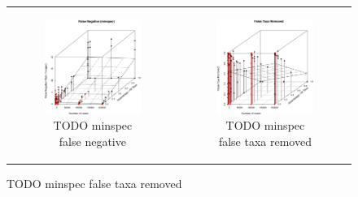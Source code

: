 \begin{figure}
\begin{tabular}{cc}
\begin{subfigure}[b]{0.5\textwidth}
\centering
\includegraphics[width=\textwidth]{../polarfront/minspecfalsenegative.png}
\caption{TODO minspec false negative}
\label{fig:minspecvalidationminspecfalsenegative}
\end{subfigure}

&

\begin{subfigure}[b]{0.5\textwidth}
\centering
\includegraphics[width=\textwidth]{../polarfront/falsetaxaremoved.png}
\caption{TODO minspec false taxa removed}
\label{fig:minspecvalidationfalsetaxaremoved}
\end{subfigure}
\\


\end{tabular}
\end{figure}

